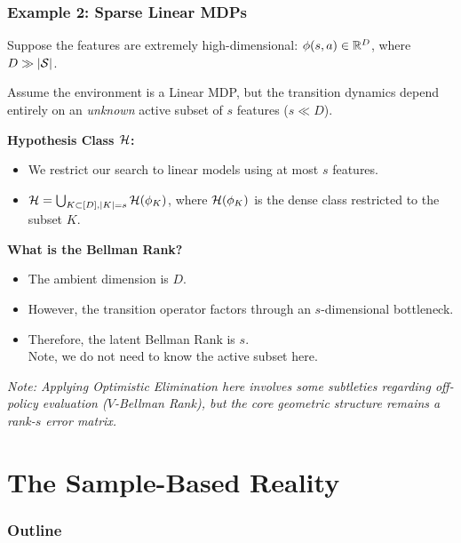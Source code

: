 \documentclass[aspectratio=169]{beamer}
\begin{document}
\begin{frame}\frametitle{Example 2: Sparse Linear MDPs}

Suppose the features are extremely high-dimensional: $\phi(s,a) \in \mathbb{R}^D$, where $D \gg |\mathcal{S}|$. 

\vspace{0.2cm}
Assume the environment is a Linear MDP, but the transition dynamics depend entirely on an \emph{unknown} active subset of $s$ features ($s \ll D$). 

\pause
\vspace{0.2cm}
\textbf{Hypothesis Class $\mathcal{H}$:}
\begin{itemize}
    \item We restrict our search to linear models using at most $s$ features.
    \item $\mathcal{H} = \bigcup_{K \subset [D], |K|=s} \mathcal{H}(\phi_K)$, where $\mathcal{H}(\phi_K)$ is the dense class restricted to the subset $K$.
\end{itemize}

\pause
\vspace{0.2cm}
\textbf{What is the Bellman Rank?}
\begin{itemize}
    \item The ambient dimension is $D$.
    \item However, the transition operator factors through an $s$-dimensional bottleneck.
    \item Therefore, the latent Bellman Rank is $s$.\\
      \alert{Note, we do not need to know the active subset here.}
\end{itemize}

\vspace{0.1cm}
\pause
\textit{Note: Applying Optimistic Elimination here involves some subtleties regarding off-policy evaluation ($V$-Bellman Rank), but the core geometric structure remains a rank-$s$ error matrix.}
\end{frame}

\section{The Sample-Based Reality}

\begin{frame}[noframenumbering]
  \frametitle{Outline}
  \tableofcontents[currentsection]
\end{frame}
\end{document}
